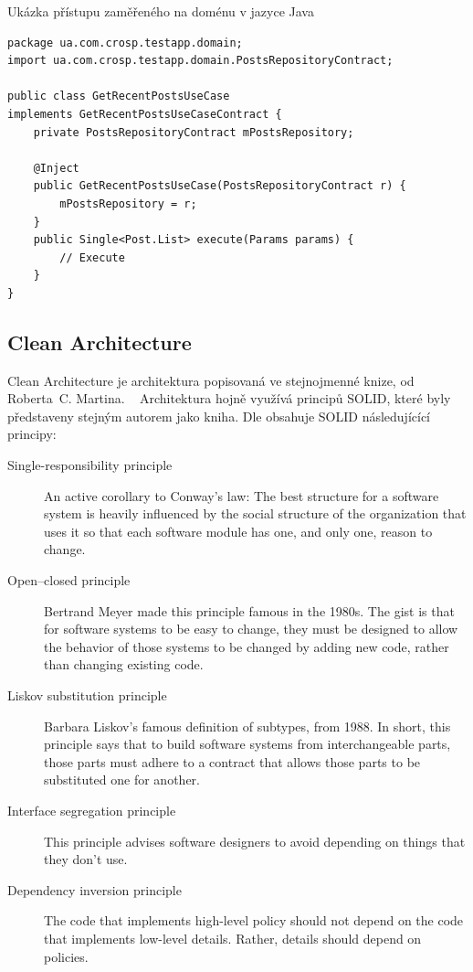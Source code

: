 \begin{listing}
    \caption{Ukázka přístupu zaměřeného na doménu v jazyce Java~\cite{architecture}}
    \label{code:architecture-domain}
    \begin{verbatim}
package ua.com.crosp.testapp.domain;
import ua.com.crosp.testapp.domain.PostsRepositoryContract;

public class GetRecentPostsUseCase
implements GetRecentPostsUseCaseContract {
    private PostsRepositoryContract mPostsRepository;

    @Inject
    public GetRecentPostsUseCase(PostsRepositoryContract r) {
        mPostsRepository = r;
    }
    public Single<Post.List> execute(Params params) {
        // Execute
    }
}
    \end{verbatim}
\end{listing}

\subsection{Clean Architecture}

Clean Architecture je architektura popisovaná ve stejnojmenné knize,
od Roberta~C. Martina.
~\cite[část 3]{martin_clean_architecture}
Architektura hojně využívá principů SOLID,
které byly představeny stejným autorem jako kniha.
Dle \cite[část 3]{martin_clean_architecture} obsahuje SOLID následujícící principy:

\begin{description}
    \item[Single-responsibility principle] An active corollary to Conway’s law: The best structure for a software system is heavily influenced
    by the social structure of the organization that uses it so that
    each software module has one, and only one, reason to change.
    \item[Open--closed principle] Bertrand Meyer made this principle famous
    in the 1980s.
    The gist is that for software systems to be easy to change,
    they must be designed to allow the behavior of those systems to be changed
    by adding new code,
    rather than changing existing code.
    \item[Liskov substitution principle] Barbara Liskov’s famous definition of
    subtypes, from 1988.
    In short, this principle says that to build software systems from
    interchangeable parts,
    those parts must adhere to a contract that allows those parts to be
    substituted one for another.
    \item[Interface segregation principle] This principle advises software
    designers to avoid depending on things that they don’t use.
    \item[Dependency inversion principle] The code that implements high-level
    policy should not depend on the code that implements low-level details.
    Rather, details should depend on policies.
\end{description}

